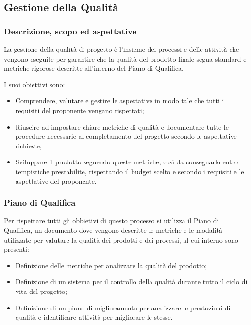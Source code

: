 \pagebreak %
\subsection{Gestione della Qualità}

\subsubsection{Descrizione, scopo ed aspettative}
La gestione della qualità di progetto è l'insieme dei processi e delle attività che vengono eseguite per garantire che la qualità del prodotto finale
segua standard e metriche rigorose descritte all'interno del Piano di Qualifica.

I suoi obiettivi sono:
\begin{itemize}
    \item Comprendere, valutare e gestire le aspettative in modo tale che tutti i requisiti del proponente vengano rispettati;
    \item Riuscire ad impostare chiare metriche di qualità e documentare tutte le procedure necessarie al completamento del progetto secondo le aspettative richieste;
    \item Sviluppare il prodotto seguendo queste metriche, così da consegnarlo entro tempistiche prestabilite, rispettando il budget scelto e secondo i requisiti e le aspettative del proponente.
\end{itemize}
\subsubsection{Piano di Qualifica}

Per rispettare tutti gli obbietivi di questo processo si utilizza il Piano di Qualifica, un documento dove vengono descritte le metriche e le modalità utilizzate per valutare la qualità dei prodotti e dei processi,
al cui interno sono presenti:

\begin{itemize}
    \item Definizione delle metriche per analizzare la qualità del prodotto;
    \item Definizione di un sistema per il controllo della qualità durante tutto il ciclo di vita del progetto;
    \item Definizione di un piano di miglioramento per analizzare le prestazioni di qualità e identificare attività per migliorare le stesse.
\end{itemize}

